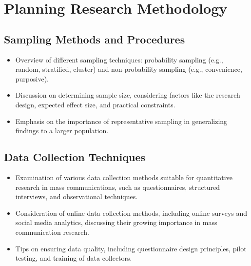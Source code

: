 \documentclass[
]{book}
\begin{document}
\hypertarget{planning-research-methodology}{%
\section*{Planning Research Methodology}\label{planning-research-methodology}}

\hypertarget{sampling-methods-and-procedures}{%
\subsection*{Sampling Methods and Procedures}\label{sampling-methods-and-procedures}}

\begin{itemize}
\item
  Overview of different sampling techniques: probability sampling (e.g., random, stratified, cluster) and non-probability sampling (e.g., convenience, purposive).
\item
  Discussion on determining sample size, considering factors like the research design, expected effect size, and practical constraints.
\item
  Emphasis on the importance of representative sampling in generalizing findings to a larger population.
\end{itemize}

\hypertarget{data-collection-techniques}{%
\subsection*{Data Collection Techniques}\label{data-collection-techniques}}

\begin{itemize}
\item
  Examination of various data collection methods suitable for quantitative research in mass communications, such as questionnaires, structured interviews, and observational techniques.
\item
  Consideration of online data collection methods, including online surveys and social media analytics, discussing their growing importance in mass communication research.
\item
  Tips on ensuring data quality, including questionnaire design principles, pilot testing, and training of data collectors.
\end{itemize}
\end{document}
